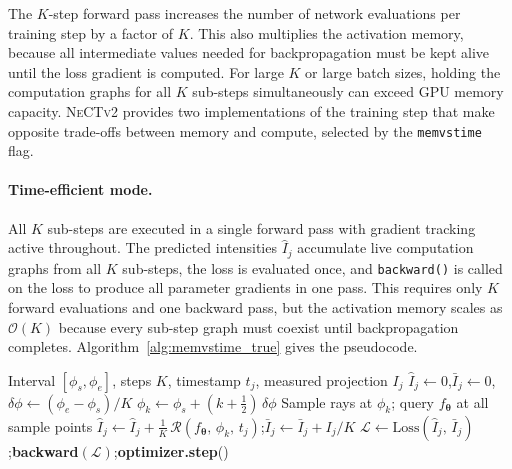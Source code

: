 \documentclass[12pt, a4paper, twoside]{report}
\newcommand{\NeCTv}{\textsc{NeCTv2}}
\begin{document}
The $K$-step forward pass increases the number of network evaluations per training step by a factor of $K$. This also multiplies the activation memory, because all intermediate values needed for backpropagation must be kept alive until the loss gradient is computed. For large $K$ or large batch sizes, holding the computation graphs for all $K$ sub-steps simultaneously can exceed GPU memory capacity. \NeCTv{} provides two implementations of the training step that make opposite trade-offs between memory and compute, selected by the \texttt{memvstime} flag.

\paragraph{Time-efficient mode.}
All $K$ sub-steps are executed in a single forward pass with gradient tracking active throughout. The predicted intensities $\hat{I}_j$ accumulate live computation graphs from all $K$ sub-steps, the loss is evaluated once, and \texttt{backward()} is called on the loss to produce all parameter gradients in one pass. This requires only $K$ forward evaluations and one backward pass, but the activation memory scales as $\mathcal{O}(K)$ because every sub-step graph must coexist until backpropagation completes. Algorithm~\ref{alg:memvstime_true} gives the pseudocode.

\begin{algorithm}[htbp]
\caption{Continuous-Scan Training Step --- Time-Efficient}
\label{alg:memvstime_true}
\begin{algorithmic}[1]
\Require Interval $[\phi_s, \phi_e]$, steps $K$, timestamp $t_j$, measured projection $I_j$
\State $\hat{I}_j \gets 0$,\quad $\bar{I}_j \gets 0$,\quad $\delta\phi \gets (\phi_e - \phi_s)/K$
 \hfill{}
    \State $\phi_k \gets \phi_s + (k+\tfrac{1}{2})\,\delta\phi$
    \State Sample rays at $\phi_k$; query $f_{\boldsymbol{\theta}}$ at all sample points
    \State $\hat{I}_j \gets \hat{I}_j + \tfrac{1}{K}\,\mathcal{R}(f_{\boldsymbol{\theta}},\,\phi_k,\,t_j)$;\quad $\bar{I}_j \gets \bar{I}_j + I_j/K$
\EndFor
\State $\mathcal{L} \gets \mathrm{Loss}(\hat{I}_j,\,\bar{I}_j)$;\quad \textbf{backward}$(\mathcal{L})$;\quad \textbf{optimizer.step}()
\end{algorithmic}
\end{algorithm}
\end{document}
